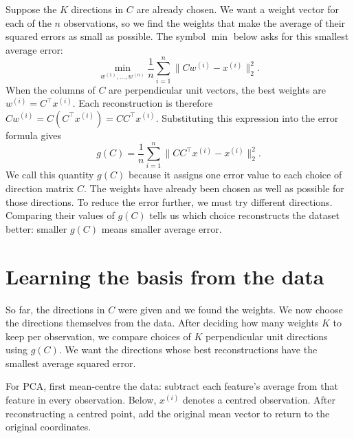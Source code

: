 Suppose the $K$ directions in $C$ are already chosen. We want a weight
vector for each of the $n$ observations, so we find the weights that
make the average of their squared errors as small as possible.
The symbol $\min$ below asks for this smallest average error:
\[
  \min_{w^{(1)},\ldots,w^{(n)}}
    \frac{1}{n}\sum_{i=1}^{n}
      \lVert Cw^{(i)}-x^{(i)}\rVert_2^2.
\]
When the columns of $C$ are perpendicular unit vectors, the best
weights are $w^{(i)}=C^\top x^{(i)}$. Each reconstruction is therefore
$Cw^{(i)}=C(C^\top x^{(i)})=CC^\top x^{(i)}$.
Substituting this expression into the error formula gives
\[
  \boxed{g(C)=\frac{1}{n}\sum_{i=1}^{n}
    \lVert CC^\top x^{(i)}-x^{(i)}\rVert_2^2.}
\]
We call this quantity $g(C)$ because it assigns one error value to
each choice of direction matrix $C$. The weights have already been
chosen as well as possible for those directions. To reduce the error
further, we must try different directions. Comparing their values of
$g(C)$ tells us which choice reconstructs the dataset better:
smaller $g(C)$ means smaller average error.

\section{Learning the basis from the data}

So far, the directions in $C$ were given and we found the weights.
We now choose the directions themselves from the data. After deciding
how many weights $K$ to keep per observation, we compare choices of
$K$ perpendicular unit directions using $g(C)$. We want the directions
whose best reconstructions have the smallest average squared error.

For PCA, first mean-centre the data: subtract each feature's average
from that feature in every observation. Below, $x^{(i)}$ denotes a
centred observation. After reconstructing a centred point, add the
original mean vector to return to the original coordinates.

